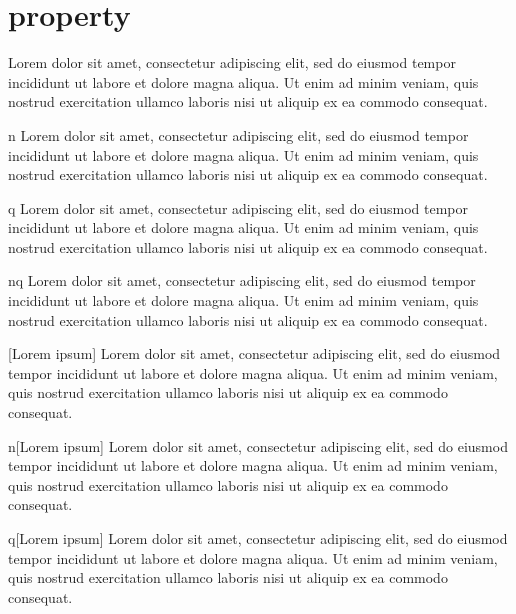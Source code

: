 \newpage

\section{property}

\begin{property}{}
	Lorem dolor sit amet, consectetur adipiscing elit, sed do eiusmod tempor incididunt ut labore et dolore magna aliqua. Ut enim ad minim veniam, quis nostrud exercitation ullamco laboris nisi ut aliquip ex ea commodo consequat.
\end{property}

\begin{property}{n}
	Lorem dolor sit amet, consectetur adipiscing elit, sed do eiusmod tempor incididunt ut labore et dolore magna aliqua. Ut enim ad minim veniam, quis nostrud exercitation ullamco laboris nisi ut aliquip ex ea commodo consequat.
\end{property}

\begin{property}{q}
	Lorem dolor sit amet, consectetur adipiscing elit, sed do eiusmod tempor incididunt ut labore et dolore magna aliqua. Ut enim ad minim veniam, quis nostrud exercitation ullamco laboris nisi ut aliquip ex ea commodo consequat.
\end{property}

\begin{property}{nq}
	Lorem dolor sit amet, consectetur adipiscing elit, sed do eiusmod tempor incididunt ut labore et dolore magna aliqua. Ut enim ad minim veniam, quis nostrud exercitation ullamco laboris nisi ut aliquip ex ea commodo consequat.
\end{property}

\begin{property}{}[Lorem ipsum]
	Lorem dolor sit amet, consectetur adipiscing elit, sed do eiusmod tempor incididunt ut labore et dolore magna aliqua. Ut enim ad minim veniam, quis nostrud exercitation ullamco laboris nisi ut aliquip ex ea commodo consequat.
\end{property}

\begin{property}{n}[Lorem ipsum]
	Lorem dolor sit amet, consectetur adipiscing elit, sed do eiusmod tempor incididunt ut labore et dolore magna aliqua. Ut enim ad minim veniam, quis nostrud exercitation ullamco laboris nisi ut aliquip ex ea commodo consequat.
\end{property}

\begin{property}{q}[Lorem ipsum]
	Lorem dolor sit amet, consectetur adipiscing elit, sed do eiusmod tempor incididunt ut labore et dolore magna aliqua. Ut enim ad minim veniam, quis nostrud exercitation ullamco laboris nisi ut aliquip ex ea commodo consequat.
\end{property}


